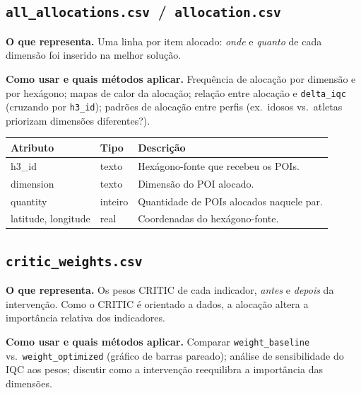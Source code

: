 \documentclass[11pt,a4paper]{article}
\begin{document}
\subsection{\texttt{all\_allocations.csv} \,/\, \texttt{allocation.csv}}

\textbf{O que representa.} Uma linha por item alocado: \emph{onde} e \emph{quanto}
de cada dimensão foi inserido na melhor solução.

\textbf{Como usar e quais métodos aplicar.} Frequência de alocação por dimensão e
por hexágono; mapas de calor da alocação; relação entre alocação e
\texttt{delta\_iqc} (cruzando por \texttt{h3\_id}); padrões de alocação entre
perfis (ex.\ idosos vs.\ atletas priorizam dimensões diferentes?).

\begin{center}\small
\begin{tabular}{@{}>{\ttfamily}l l p{8.0cm}@{}}
\toprule
\normalfont Atributo & \normalfont Tipo & \normalfont Descrição \\
\midrule
h3\_id    & texto   & Hexágono-fonte que recebeu os POIs. \\
dimension & texto   & Dimensão do POI alocado. \\
quantity  & inteiro & Quantidade de POIs alocados naquele par. \\
latitude, longitude & real & Coordenadas do hexágono-fonte. \\
\bottomrule
\end{tabular}
\end{center}

\subsection{\texttt{critic\_weights.csv}}

\textbf{O que representa.} Os pesos CRITIC de cada indicador, \emph{antes} e
\emph{depois} da intervenção. Como o CRITIC é orientado a dados, a alocação altera
a importância relativa dos indicadores.

\textbf{Como usar e quais métodos aplicar.} Comparar \texttt{weight\_baseline} vs.\
\texttt{weight\_optimized} (gráfico de barras pareado); análise de sensibilidade do
IQC aos pesos; discutir como a intervenção reequilibra a importância das
dimensões.
\end{document}
